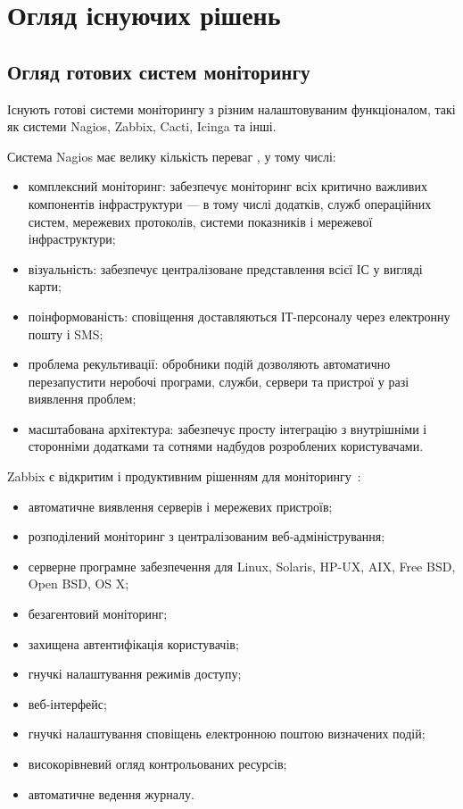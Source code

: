 \documentclass{thesis_utf8}
\begin{document}
\chapter{Огляд існуючих рішень}

\section{Огляд готових систем моніторингу}
\label{section:overview}

Існують готові системи моніторингу з різним налаштовуваним функціоналом, такі як системи Nagios, Zabbix, Cacti, Icinga та інші.

Система Nagios має велику кількість переваг \cite{nagios}, у тому числі:
\begin{itemize}
    \item комплексний моніторинг: забезпечує моніторинг всіх критично важливих компонентів інфраструктури --- в тому числі додатків, служб операційних систем, мережевих протоколів, системи показників і мережевої інфраструктури;
    \item	візуальність: забезпечує централізоване представлення всієї ІС у вигляді карти;
    \item	поінформованість: сповіщення доставляються ІТ-персоналу через електронну пошту і SMS;
    \item	проблема рекультивації: обробники подій дозволяють автоматично перезапустити неробочі програми, служби, сервери та пристрої у разі виявлення проблем;
    \item масштабована архітектура: забезпечує просту інтеграцію з внутрішніми і сторонніми додатками та сотнями надбудов розроблених користувачами.
\end{itemize}

Zabbix є відкритим і продуктивним рішенням для моніторингу~\cite{zabbix}:

\begin{itemize}
    \item автоматичне виявлення серверів і мережевих пристроїв;
    \item розподілений моніторинг з централізованим веб-адміністрування;
    \item серверне програмне забезпечення для Linux, Solaris, HP-UX, AIX, Free BSD, Open BSD, OS X;
    \item безагентовий моніторинг;
    \item захищена автентифікація користувачів;
    \item гнучкі налаштування режимів доступу;
    \item веб-інтерфейс;
    \item гнучкі налаштування сповіщень електронною поштою визначених подій;
    \item високорівневий огляд контрольованих ресурсів;
    \item автоматичне ведення журналу.
\end{itemize}
\end{document}
